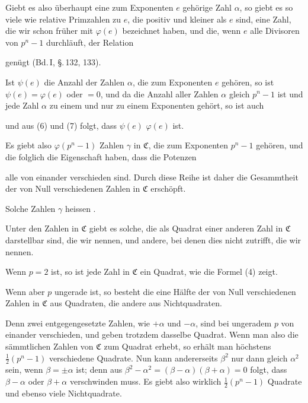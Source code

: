 Giebt es also überhaupt eine zum Exponenten $e$ gehörige Zahl $\alpha$, so giebt es so viele wie relative Primzahlen zu $e$, die positiv und kleiner als $e$ sind, eine Zahl, die wir schon früher mit $\varphi(e)$ bezeichnet haben, und die, wenn $e$ alle Divisoren von $p^n - 1$ durchläuft, der Relation


genügt (Bd.\,I, \S.\,132, 133).

Ist $\psi(e)$ die Anzahl der Zahlen $\alpha$, die zum Exponenten $e$ gehören, so ist $\psi(e) = \varphi(e)$ oder $= 0$, und da die Anzahl aller Zahlen $\alpha$ gleich $p^n - 1$ ist und jede Zahl $\alpha$ zu einem und nur zu einem Exponenten gehört, so ist auch


und aus (6) und (7) folgt, dass $\psi(e)$  $\varphi(e)$ ist.

Es giebt also $\varphi(p^n - 1)$ Zahlen $\gamma$ in $\mathfrak{C}$, die zum Exponenten $p^n - 1$ gehören, und die folglich die Eigenschaft haben, dass die Potenzen


alle von einander verschieden sind. Durch diese Reihe ist daher die Gesammtheit der von Null verschiedenen Zahlen in $\mathfrak{C}$ erschöpft.

Solche Zahlen $\gamma$ heissen .

Unter den Zahlen in $\mathfrak{C}$ giebt es solche, die als Quadrat einer anderen Zahl in $\mathfrak{C}$ darstellbar sind, die wir  nennen, und andere, bei denen dies nicht zutrifft, die wir  nennen.

Wenn $p = 2$ ist, so ist jede Zahl in $\mathfrak{C}$ ein Quadrat, wie die Formel (4) zeigt.

Wenn aber $p$ ungerade ist, so besteht die eine Hälfte der von Null verschiedenen Zahlen in $\mathfrak{C}$ aus Quadraten, die andere aus Nichtquadraten.

Denn zwei entgegengesetzte Zahlen, wie $+\alpha$ und $-\alpha$, sind bei ungeradem $p$ von einander verschieden, und geben trotzdem dasselbe Quadrat. Wenn man also die sämmtlichen Zahlen von $\mathfrak{C}$ zum Quadrat erhebt, so erhält man höchstens $\frac{1}{2}(p^n - 1)$ verschiedene Quadrate. Nun kann andererseits $\beta^2$ nur dann gleich $\alpha^2$ sein, wenn $\beta = \pm\alpha$ ist; denn aus $\beta^2 - \alpha^2 = (\beta - \alpha)(\beta + \alpha) = 0$ folgt, dass $\beta - \alpha$ oder $\beta + \alpha$ verschwinden muss. Es giebt also wirklich $\frac{1}{2}(p^n - 1)$ Quadrate und ebenso viele Nichtquadrate.

